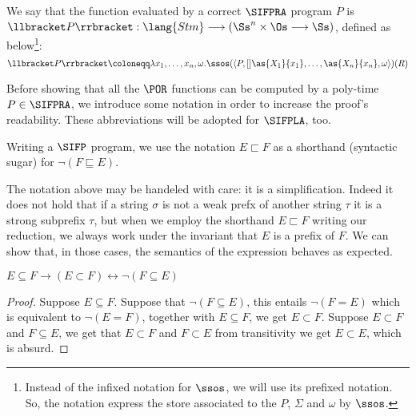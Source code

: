 \begin{defn}
  \label{def:simprafuneval}
We say that the function evaluated by a correct $\SIFPRA$ program $P$ is $\mathcal \llbracket P\rrbracket: \lang{Stm} \longrightarrow (\Ss^n \times \Os \longrightarrow \Ss)$, defined as below\footnote{Instead of the infixed notation for $\ssos$, we will use its prefixed notation. So, the notation express the store associated to the $P$, $\Sigma$ and $\omega$ by $\ssos$.}:
\[
\llbracket P\rrbracket\coloneqq \lambda x_1, \ldots, x_n, \omega.\ssos(\langle P, []\as {X_1} {x_1}, \ldots, \as {X_n} {x_n}, \omega\rangle)(R)
\]
\end{defn}


Before showing that all the $\POR$ functions can be computed by a poly-time
$P \in \SIFPRA$, we introduce some notation in order to increase
the proof's readability. These abbreviations will be adopted for $\SIFPLA$, too.

%
%
%
\begin{notation}
Writing a $\SIFP$ program, we use the notation $E \sqsubset F$ as a shorthand (syntactic sugar) for $\lnot (F \sqsubseteq E)$.
\end{notation}

The notation above may be handeled with care: it is a simplification. Indeed it
does not hold that if a string $\sigma$ is not a weak prefx of another string $\tau$
it is a strong subprefix $\tau$, but when we employ the shorthand $E \sqsubset F$
writing our reduction, we always work under the invariant that $E$ is a prefix of $F$.
%
We can show that, in those cases, the semantics of the expression behaves as expected.

\begin{remark}
  $E \subseteq F \to (E \subset F) \leftrightarrow \lnot (F \subseteq E)$
\end{remark}
\begin{proof}
  Suppose $E\subseteq F$. Suppose that $\lnot (F \subseteq E)$, this entails $\lnot (F=E)$ which is equivalent to $\lnot (E=F)$, together with $E\subseteq F$, we get $E \subset F$.
  Suppose $E \subset F$ and $F \subseteq E$, we get that $E \subset F$ and $F \subset E$ from transitivity we get $E \subset E$, which is absurd.
\end{proof}

